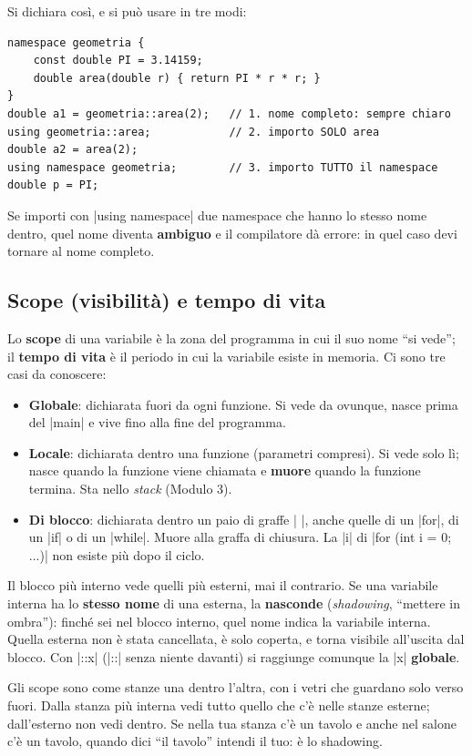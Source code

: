 Si dichiara così, e si può usare in tre modi:
\begin{lstlisting}
namespace geometria {
    const double PI = 3.14159;
    double area(double r) { return PI * r * r; }
}
double a1 = geometria::area(2);   // 1. nome completo: sempre chiaro
using geometria::area;            // 2. importo SOLO area
double a2 = area(2);
using namespace geometria;        // 3. importo TUTTO il namespace
double p = PI;
\end{lstlisting}
Se importi con \cc|using namespace| due namespace che hanno lo stesso nome
dentro, quel nome diventa \textbf{ambiguo} e il compilatore dà errore: in quel
caso devi tornare al nome completo.

\subsection*{Scope (visibilità) e tempo di vita}

Lo \textbf{scope} di una variabile è la zona del programma in cui il suo nome
``si vede''; il \textbf{tempo di vita} è il periodo in cui la variabile esiste
in memoria. Ci sono tre casi da conoscere:
\begin{itemize}
  \item \textbf{Globale}: dichiarata fuori da ogni funzione. Si vede da
        ovunque, nasce prima del \cc|main| e vive fino alla fine del programma.
  \item \textbf{Locale}: dichiarata dentro una funzione (parametri compresi).
        Si vede solo lì; nasce quando la funzione viene chiamata e
        \textbf{muore} quando la funzione termina. Sta nello \emph{stack}
        (Modulo 3).
  \item \textbf{Di blocco}: dichiarata dentro un paio di graffe \cc|{ }|, anche
        quelle di un \cc|for|, di un \cc|if| o di un \cc|while|. Muore alla graffa
        di chiusura. La \cc|i| di \cc|for (int i = 0; ...)| non esiste più dopo il ciclo.
\end{itemize}

Il blocco più interno vede quelli più esterni, mai il contrario. Se una
variabile interna ha lo \textbf{stesso nome} di una esterna, la
\textbf{nasconde} (\emph{shadowing}, ``mettere in ombra''): finché sei nel blocco
interno, quel nome indica la variabile interna. Quella esterna non è stata
cancellata, è solo coperta, e torna visibile all'uscita dal blocco. Con
\cc|::x| (\cc|::| senza niente davanti) si raggiunge comunque la \cc|x|
\textbf{globale}.

\begin{analogia}
Gli scope sono come stanze una dentro l'altra, con i vetri che guardano solo
verso fuori. Dalla stanza più interna vedi tutto quello che c'è nelle stanze
esterne; dall'esterno non vedi dentro. Se nella tua stanza c'è un tavolo e
anche nel salone c'è un tavolo, quando dici ``il tavolo'' intendi il tuo: è lo
shadowing.
\end{analogia}

